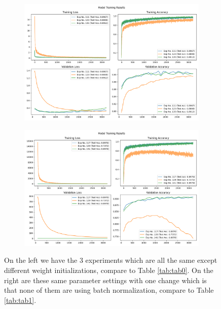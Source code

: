 \documentclass[10pt]{amsart}
\begin{document}
\begin{figure}[h]
\vspace*{-6mm}
    \centering
    \begin{subfigure}{0.49\textwidth}
        \centering
        \includegraphics[width=.6\textwidth]{../visualizations/model_training_results_vis_10.png}
        \label{fig:image1}
    \end{subfigure}
    \begin{subfigure}{0.49\textwidth}
        \centering
        \includegraphics[width=.6\textwidth]{../visualizations/model_training_results_vis_11.png}
        \label{fig:image2}
    \end{subfigure}
    \caption{On the left we have the 3 experiments which are all the same except different weight initializations, compare to Table \ref{tab:tab0}.
    On the right are these same parameter settings with one change which is that none of them are using batch normalization, compare to Table \ref{tab:tab1}.}
    \label{fig:f0}
\vspace*{-7mm}
\end{figure}
\end{document}
